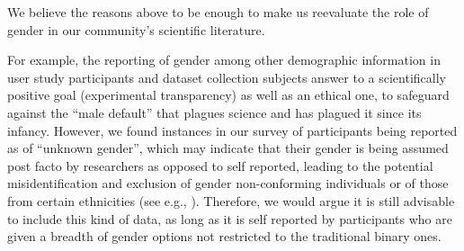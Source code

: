 \documentclass[nonacm,sigconf,review,balance=false]{acmart}
\begin{document}


We believe the reasons above to be enough to make us reevaluate the role of
gender in our community's scientific literature.

For example, the reporting of gender among other demographic information in user
study participants and dataset collection subjects answer to a scientifically
positive goal (experimental transparency) as well as an ethical one, to
safeguard against the “male default” that plagues science and has plagued it
since its infancy. However, we found instances in our survey of participants
being reported as of “unknown gender”, which may indicate that their gender is
being assumed post facto by researchers as opposed to self reported, leading to
the potential misidentification and exclusion of gender non-conforming
individuals or of those from certain ethnicities (see e.g.,
\cite{santamaria2018comparison,buolamwini2018gender}). Therefore, we would argue
it is still advisable to include this kind of data, as long as it is self
reported by participants who are given a breadth of gender options not
restricted to the traditional binary ones.
\end{document}
